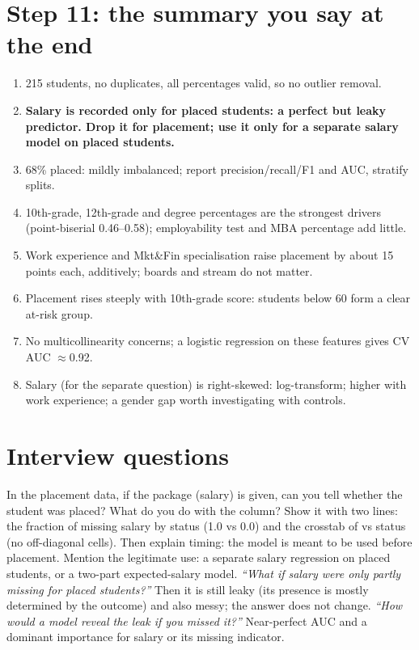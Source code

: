 \section{Step 11: the summary you say at the end}
\begin{enumerate}
\item 215 students, no duplicates, all percentages valid, so no outlier removal.
\item \textbf{Salary is recorded only for placed students: a perfect but leaky predictor. Drop it for placement; use it only for a separate salary model on placed students.}
\item 68\% placed: mildly imbalanced; report precision/recall/F1 and AUC, stratify splits.
\item 10th-grade, 12th-grade and degree percentages are the strongest drivers (point-biserial 0.46--0.58); employability test and MBA percentage add little.
\item Work experience and Mkt\&Fin specialisation raise placement by about 15 points each, additively; boards and stream do not matter.
\item Placement rises steeply with 10th-grade score: students below 60 form a clear at-risk group.
\item No multicollinearity concerns; a logistic regression on these features gives CV AUC $\approx$0.92.
\item Salary (for the separate question) is right-skewed: log-transform; higher with work experience; a gender gap worth investigating with controls.
\end{enumerate}

\section{Interview questions}

\begin{qa}{ In the placement data, if the package (salary) is given, can you tell whether the student was placed? What do you do with the column?}
\why Show it with two lines: the fraction of missing salary by status (1.0 vs 0.0) and the crosstab of  vs status (no off-diagonal cells). Then explain timing:
the model is meant to be used before placement. Mention the legitimate use: a separate salary regression on placed students, or a two-part expected-salary model.
\pushes \emph{``What if salary were only partly missing for placed students?''} Then it is still leaky (its presence is mostly determined by the outcome) and also messy; the answer does not
change. \emph{``How would a model reveal the leak if you missed it?''} Near-perfect AUC and a dominant importance for salary or its missing indicator.
\end{qa}

